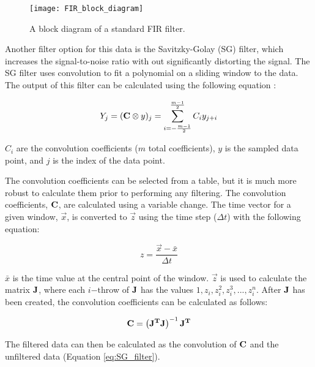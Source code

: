 \begin{figure}
	\centering
	\texttt{[image: FIR\_block\_diagram]}
	\decoRule
	\caption{A block diagram of a standard FIR filter. \cite{wiki:FIR_block_diagram}}
	\label{fig:FIR_block_diagram}
\end{figure}

Another filter option for this data is the Savitzky-Golay (SG) filter, which increases the signal-to-noise ratio with out significantly distorting the signal.  The SG filter uses convolution to fit a polynomial on a sliding window to the data.  The output of this filter can be calculated using the following equation \cite{SG_filter}:

\begin{equation} \label{eq:SG_filter}
	Y_j = (\mathbf{C} \otimes y)_j = \sum_{i=-\frac{m-1}{2}}^{\frac{m-1}{2}} C_iy_{j+i}
\end{equation}

$C_i$ are the convolution coefficients ($m$ total coefficients), $y$ is the sampled data point, and $j$ is the index of the data point. 

The convolution coefficients can be selected from a table, but it is much more robust to calculate them prior to performing any filtering.  The convolution coefficients, $\mathbf{C}$, are calculated using a variable change.  The time vector for a given window, $\vec{x}$, is converted to $\vec{z}$ using the time step ($\Delta t$) with the following equation:

\begin{equation}
	z = \frac{\vec{x} - \bar{x}}{\Delta t}
\end{equation}

$\bar{x}$ is the time value at the central point of the window.  $\vec{z}$ is used to calculate the matrix $\mathbf{J}$, where each $i\mathrm{-th}$row of $\mathbf{J}$ has the values $1, z_i, z_i^2, z_i^3, ..., z_i^n$.  After $\mathbf{J}$ has been created, the convolution coefficients can be calculated as follows:

\begin{equation}
	\mathbf{C} = \left(\mathbf{J^TJ}\right)^{-1}\mathbf{J^T}
\end{equation}

The filtered data can then be calculated as the convolution of $\mathbf{C}$ and the unfiltered data (Equation \ref{eq:SG_filter}).



